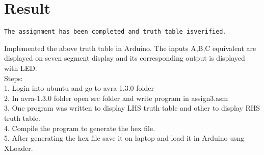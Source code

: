 \documentclass{article}
\begin{document}
\section{Result}

\begin{verbatim}
The assignment has been completed and truth table isverified.
\end{verbatim}
Implemented the above truth table in Arduino. The inputs A,B,C equivalent are displayed on seven segment display and its corresponding output is displayed with LED.\\
Steps: \\
1. Login into ubuntu and go to avra-1.3.0 folder\\
2. In avra-1.3.0 folder open src folder and write program in assign3.asm\\
3. One program was written to display LHS truth table and other to display RHS truth table.\\
4. Compile the program to generate the hex file.\\
5. After generating the hex file save it on laptop and load it in Arduino usng XLoader.\\
\end{document}

